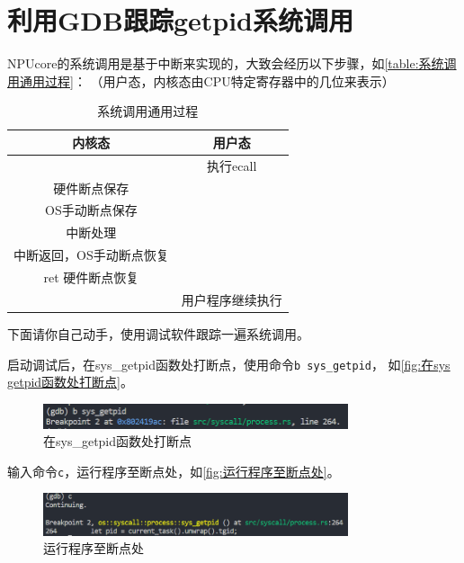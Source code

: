 \section{利用GDB跟踪getpid系统调用}

NPUcore的系统调用是基于中断来实现的，大致会经历以下步骤，如\autoref{table:系统调用通用过程}：
（用户态，内核态由CPU特定寄存器中的几位来表示）

\begin{table}[h]
    \centering
    \caption{系统调用通用过程}
    \label{table:系统调用通用过程}
    \begin{tabular}{|c|c|}
        \hline
        \textbf{内核态}  & \textbf{用户态}     \\\hline
                        & 执行ecall          \\\hline
        硬件断点保存     &                    \\\hline
        OS手动断点保存   &                    \\\hline
        中断处理         &                    \\\hline
        中断返回，OS手动断点恢复 &                \\\hline
        ret 硬件断点恢复 &                    \\\hline
                        & 用户程序继续执行     \\\hline
    \end{tabular}
\end{table}

下面请你自己动手，使用调试软件跟踪一遍系统调用。

启动调试后，在sys_getpid函数处打断点，使用命令\lstinline`b sys_getpid`，
如\autoref{fig:在sys getpid函数处打断点}。

\begin{figure}[htb]
    \centering
    \includegraphics[width=0.8\textwidth]{figures/03-02-利用GDB跟踪getpid系统调用1.png}
    \caption{在sys_getpid函数处打断点}
    \label{fig:在sys getpid函数处打断点}
\end{figure}

输入命令\lstinline`c`，运行程序至断点处，如\autoref{fig:运行程序至断点处}。

\begin{figure}[htb]
    \centering
    \includegraphics[width=0.8\textwidth]{figures/03-02-利用GDB跟踪getpid系统调用2.png}
    \caption{运行程序至断点处}
    \label{fig:运行程序至断点处}
\end{figure}

